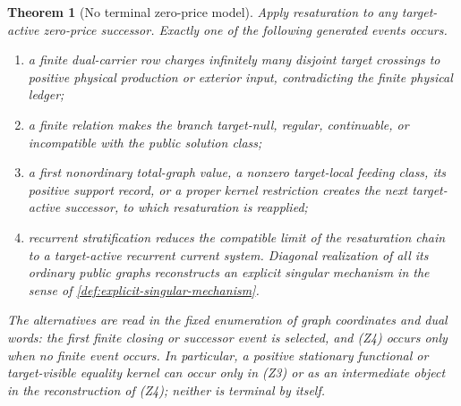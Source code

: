 \documentclass[11pt]{article}
\numberwithin{section}{part}
\theoremstyle{plain}
\newtheorem{theorem}{Theorem}[section]
\theoremstyle{definition}
\theoremstyle{remark}
\begin{document}
\begin{theorem}[No terminal zero-price model]
\label{thm:no-terminal-zero-price-model}
Apply resaturation to any target-active zero-price successor.  Exactly one of
the following generated events occurs.
\begin{enumerate}[label=\textup{(Z\arabic*)}]
\item a finite dual-carrier row charges infinitely many disjoint target
crossings to positive physical production or exterior input, contradicting
the finite physical ledger;
\item a finite relation makes the branch target-null, regular, continuable,
or incompatible with the public solution class;
\item a first nonordinary total-graph value, a nonzero target-local feeding
class, its positive support record, or a proper kernel restriction creates
the next target-active successor, to which resaturation is reapplied;
\item recurrent stratification reduces the compatible limit of the
resaturation chain to a target-active recurrent current system.  Diagonal
realization of all its ordinary public graphs reconstructs an explicit
singular mechanism in the sense of \cref{def:explicit-singular-mechanism}.
\end{enumerate}
The alternatives are read in the fixed enumeration of graph coordinates and
dual words: the first finite closing or successor event is selected, and
\textup{(Z4)} occurs only when no finite event occurs.
In particular, a positive stationary functional or target-visible equality
kernel can occur only in \textup{(Z3)} or as an intermediate object in the
reconstruction of \textup{(Z4)}; neither is terminal by itself.
\end{theorem}
\end{document}
